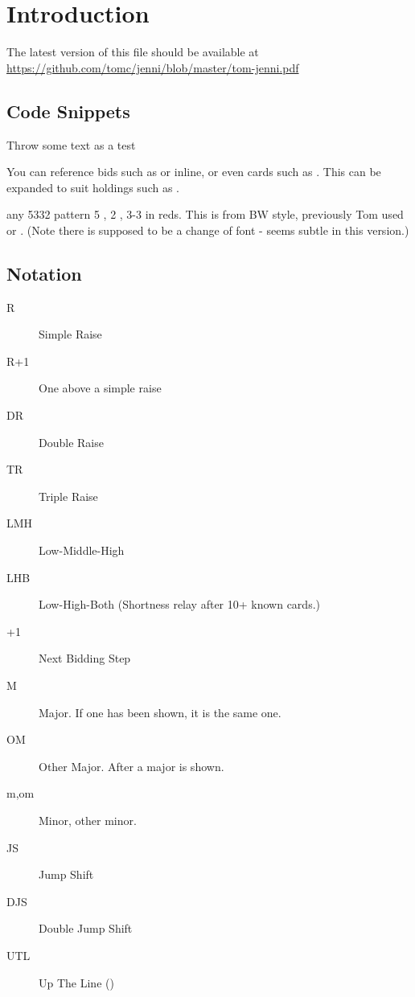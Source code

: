 \documentclass[tom-jenni]{subfile}
\begin{document}
\chapter{Introduction}


The latest version of this file should be available at \url{https://github.com/tomc/jenni/blob/master/tom-jenni.pdf}

\section{Code Snippets}

Throw some text as a test


You can reference bids such as    or  inline, or even cards such as    . This can be expanded to suit holdings such as .

 any 5332 pattern
 5 \spadesuit, 2 \clubsuit, 3-3 in reds.  This is from BW style, previously Tom used  or .  (Note there is supposed to be a change of font - seems subtle in this version.) 




\section{Notation}

\begin{description}
	\item[R] Simple Raise
	\item[R+1] One above a simple raise
	\item[DR] Double Raise
	\item[TR] Triple Raise
	\item[LMH] Low-Middle-High
	\item[LHB] Low-High-Both (Shortness relay after 10+ known cards.)
	\item[+1] Next Bidding Step
	\item[M] Major.  If one has been shown, it is the same one.
	\item[OM] Other Major.  After a major is shown.
	\item[m,om] Minor, other minor.
	\item[JS] Jump Shift
	\item[DJS] Double Jump Shift
	\item[UTL] Up The Line (\ccc\ddd\hhh\sss)
\end{description}
\end{document}

